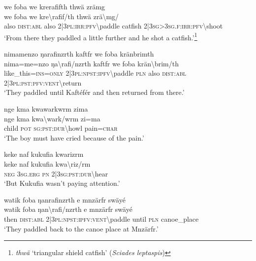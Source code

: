\ea\label{ex:9:a2285}
we foba we krerafifth thwä zrämg\\
\gll we	foba	we	kre{\textbackslash}rafif/th	thwä	zrä{\textbackslash}mg/\\
     also	\textsc{dist}:\textsc{abl}	also	2|3\textsc{pl}:\textsc{irr}:\textsc{pfv}{\textbackslash}paddle	catfish	2|3\textsc{sg}>3\textsc{sg}.\textsc{f}:\textsc{irr}:\textsc{pfv}{\textbackslash}shoot\\
\glt `From there they paddled a little further and he shot a catfish.'\footnote{\textit{thwä} `triangular shield catfish' (\textit{Sciades leptaspis})}
\z

\ea\label{ex:9:a2286}
nimamenzo ŋarafinzrth kaftfr we foba kränbrimth\\
\gll nima=me=nzo	ŋa{\textbackslash}rafi/nzrth	kaftfr	we	foba	krän{\textbackslash}brim/th\\
     like\_this=\textsc{ins}=\textsc{only}	2|3\textsc{pl}:\textsc{npst}:\textsc{ipfv}{\textbackslash}paddle	\textsc{pln}	also	\textsc{dist}:\textsc{abl}	2|3\textsc{pl}:\textsc{pst}:\textsc{pfv}:\textsc{vent}{\textbackslash}return\\
\glt `They paddled until Kaftéfér and then returned from there.'
\z

\ea\label{ex:9:a2287}
nge kma kwawarkwrm zima\\
\gll nge	kma	kwa{\textbackslash}wark/wrm	zi=ma\\
     child	\textsc{pot}	\textsc{sg}:\textsc{pst}:\textsc{dur}{\textbackslash}howl	pain=\textsc{char}\\
\glt `The boy must have cried because of the pain.'
\z

\ea\label{ex:9:a2289}
keke naf kukufia kwarizrm\\
\gll keke	naf	kukufia	kwa{\textbackslash}riz/rm\\
     \textsc{neg}	3\textsc{sg}.\textsc{erg}	\textsc{pn}	2|3\textsc{sg}:\textsc{pst}:\textsc{dur}{\textbackslash}hear\\
\glt `But Kukufia wasn't paying attention.'
\z

\ea\label{ex:9:a2290}
watik foba ŋanrafinzrth e mnzärfr swäyé\\
\gll watik	foba	ŋan{\textbackslash}rafi/nzrth	e	mnzärfr	swäyé\\
     then	\textsc{dist}:\textsc{abl}	2|3\textsc{pl}:\textsc{npst}:\textsc{ipfv}:\textsc{vent}{\textbackslash}paddle	until	\textsc{pln}	canoe\_place\\
\glt `They paddled back to the canoe place at Mnzärfr.'
\z

